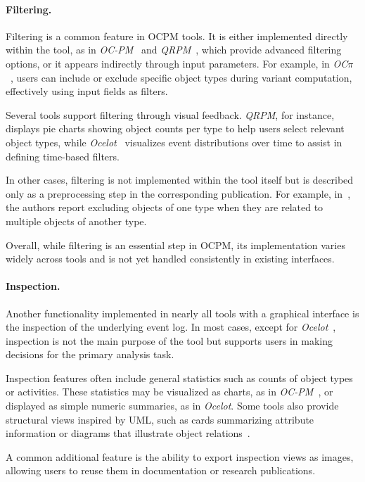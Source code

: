\paragraph{Filtering.}
Filtering is a common feature in OCPM tools. It is either implemented directly within the tool, as in \textit{OC-PM}~\cite{ocpm} and \textit{QRPM}~\cite{qrpm}, which provide advanced filtering options, or it appears indirectly through input parameters. For example, in \textit{OC$\pi$}~\cite{ocpi}, users can include or exclude specific object types during variant computation, effectively using input fields as filters.

Several tools support filtering through visual feedback. \textit{QRPM}, for instance, displays pie charts showing object counts per type to help users select relevant object types, while \textit{Ocelot}~\cite{ocel2} visualizes event distributions over time to assist in defining time-based filters.

In other cases, filtering is not implemented within the tool itself but is described only as a preprocessing step in the corresponding publication. For example, in~\cite{oxminer}, the authors report excluding objects of one type when they are related to multiple objects of another type.

Overall, while filtering is an essential step in OCPM, its implementation varies widely across tools and is not yet handled consistently in existing interfaces.

\paragraph{Inspection.}

Another functionality implemented in nearly all tools with a graphical interface is the inspection of the underlying event log.
In most cases, except for \textit{Ocelot}~\cite{ocel2}, inspection is not the main purpose of the tool but supports users in making decisions for the primary analysis task.

Inspection features often include general statistics such as counts of object types or activities.
These statistics may be visualized as charts, as in \textit{OC-PM}~\cite{ocpm}, or displayed as simple numeric summaries, as in \textit{Ocelot}.
Some tools also provide structural views inspired by UML, such as cards summarizing attribute information or diagrams that illustrate object relations~\cite{ocel2,ocpq}.

A common additional feature is the ability to export inspection views as images, allowing users to reuse them in documentation or research publications.


